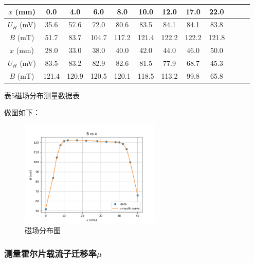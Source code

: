 \documentclass[UTF8]{ctexart}
\begin{document}
\begin{center}
    \begin{tabular}{|c|c|c|c|c|c|c|c|c|c|c|c|}
        \hline
        $x$ (mm) & 0.0 & 4.0 & 6.0 & 8.0 & 10.0 & 12.0 & 17.0 & 22.0 \\\hline
        $U_H$ (mV) & 35.6 & 57.6 & 72.0 & 80.6 & 83.5 & 84.1 & 84.1 & 83.8 \\\hline
        $B$ (mT) & 51.7 & 83.7 & 104.7 & 117.2 & 121.4 & 122.2 & 122.2 & 121.8 \\\hline
        \hline
        $x$ (mm) & 28.0 & 33.0 & 38.0 & 40.0 & 42.0 & 44.0 & 46.0 & 50.0\\\hline
        $U_H$ (mV) & 83.5 & 83.2 & 82.9 & 82.6 & 81.5 & 77.9 & 68.7 & 45.3 \\\hline
        $B$ (mT) & 121.4 & 120.9 & 120.5 & 120.1 & 118.5 & 113.2 & 99.8 & 65.8 \\\hline
    \end{tabular}
    \begin{minipage}{0.8\textwidth}
        \centering
        \fontsize{9pt}{\baselineskip}\selectfont
        表5\quad 磁场分布测量数据表
    \end{minipage}
    \label{Magnetic_field_distribution_data}
\end{center}

做图如下：

\begin{center}
    \begin{figure}[H]
        \centering
        \includegraphics[width=0.6\textwidth]{img/Magnetic_field_distribution.png}
        \caption{磁场分布图}
        \label{Magnetic_field_distribution}
    \end{figure}
\end{center}

\subsubsection{测量霍尔片载流子迁移率$\mu$}
\end{document}
